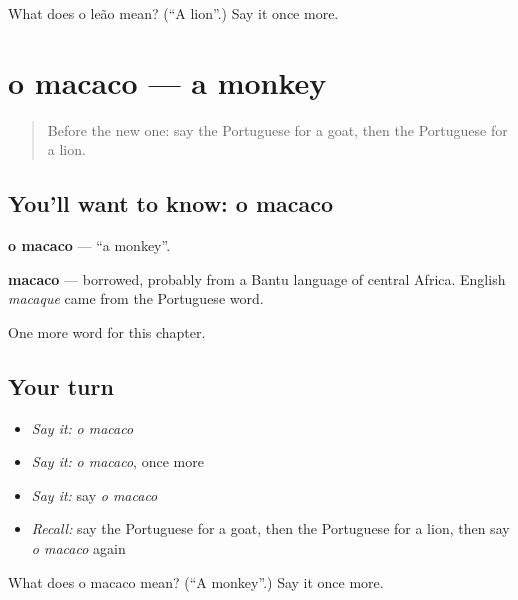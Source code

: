 \begin{tcolorbox}[breakable,colback=teal!4,colframe=teal!35!black,title={Before you move on}]
What does o leão mean? (\textquotedblleft{}A lion\textquotedblright{}.) Say it once more.
\end{tcolorbox}
\section[o macaco]{o macaco — a monkey}

\label{lesson:PT-C63-macaco}



\begin{quote}
Before the new one: say the Portuguese for a goat, then the Portuguese for a lion.
\end{quote}

\subsection*{You'll want to know: o macaco}
\textbf{o macaco} — \textquotedblleft{}a monkey\textquotedblright{}.

\begin{cousinweb}
\textbf{macaco} — borrowed, probably from a Bantu language of central Africa. English \emph{macaque} came from the Portuguese word.
\end{cousinweb}

\begin{grammarlens}[title={What you've built}]
One more word for this chapter.
\end{grammarlens}

\subsection*{Your turn}
\begin{itemize}
\raggedright
  \item \emph{Say it:} \emph{o macaco}
  \item \emph{Say it:} \emph{o macaco}, once more
  \item \emph{Say it:} say \emph{o macaco}
  \item \emph{Recall:} say the Portuguese for a goat, then the Portuguese for a lion, then say \emph{o macaco} again
\end{itemize}

\begin{tcolorbox}[breakable,colback=teal!4,colframe=teal!35!black,title={Before you move on}]
What does o macaco mean? (\textquotedblleft{}A monkey\textquotedblright{}.) Say it once more.
\end{tcolorbox}
